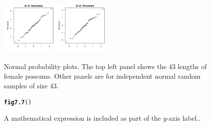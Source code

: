 \documentclass[12pt, a4paper,  BCOR=8.25mm, DIV=15]{scrartcl}\usepackage[]{graphicx}\usepackage[]{color}
\makeatletter
\newcommand{\hlstd}[1]{\textcolor[rgb]{0.345,0.345,0.345}{#1}}%
\newcommand{\hlkwd}[1]{\textcolor[rgb]{0.737,0.353,0.396}{\textbf{#1}}}%
\newenvironment{kframe}{%
 \def\at@end@of@kframe{}%
 \ifinner\ifhmode%
  \def\at@end@of@kframe{\end{minipage}}%
  \begin{minipage}{\columnwidth}%
 \fi\fi%
 \def\FrameCommand##1{\hskip\@totalleftmargin \hskip-\fboxsep
 \colorbox{shadecolor}{##1}\hskip-\fboxsep
     \hskip-\linewidth \hskip-\@totalleftmargin \hskip\columnwidth}%
 \MakeFramed {\advance\hsize-\width
   \@totalleftmargin\z@ \linewidth\hsize
   \@setminipage}}%
 {\par\unskip\endMakeFramed%
 \at@end@of@kframe}
\newenvironment{knitrout}{}{} %
\makeatother
\begin{document}
\begin{figure}[ht]
\begin{knitrout}
{\includegraphics[width=0.24\textwidth]{figure/gph-fig7_6e-7} 
\includegraphics[width=0.24\textwidth]{figure/gph-fig7_6e-8} 

}



\end{knitrout}
\vspace*{-12pt}

      \caption{Normal probability plots. The top left panel shows the 43 lengths
of female possums. Other panels are for independent normal
random samples of size 43.\label{fig:np-plots}}
\end{figure}

\begin{figure}[ht]
\vspace*{-6pt}
\begin{knitrout}
\color{fgcolor}\begin{kframe}
\begin{alltt}
\hlkwd{fig7.7}\hlstd{()}
\end{alltt}
\end{kframe}
\end{knitrout}
\caption{A mathematical expression is included as part of the
  $y$-axis label.\label{fig:area}.}
\end{figure}
\end{document}
